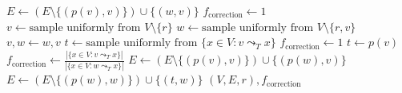 \begin{definition}
\begin{algorithmic}
                \State $E \leftarrow \left(E \setminus \{(p(v), v)\}\right)  \cup \{(w, v)\}$
                \State $f_\mathrm{correction} \leftarrow 1$
                \State $v \leftarrow \text{sample uniformly from } V \setminus \{r\}$
                \State $w \leftarrow \text{sample uniformly from } V \setminus \{r, v\}$
                    \State $v, w \leftarrow w, v$
                \EndIf
                    \State $t \leftarrow \text{sample uniformly from } \{x \in V: v \leadsto_T x\}$
                    \State $f_\mathrm{correction} \leftarrow 1$
                \Else
                    \State $t \leftarrow p(v)$
                    \State $f_\mathrm{correction} \leftarrow \frac{|\{x \in V : v \leadsto_T x\}|}{|\{x \in V : w \leadsto_T x\}|}$
                \EndIf
                \State $E \leftarrow (E \setminus \{(p(v), v)\}) \cup \{(p(w), v)\}$ 
                \State $E \leftarrow (E \setminus \{(p(w), w)\}) \cup \{(t, w)\}$
            \EndIf
            \State \Return $(V, E, r), f_\mathrm{correction}$
        \EndFunction
    \end{algorithmic}
\end{definition}